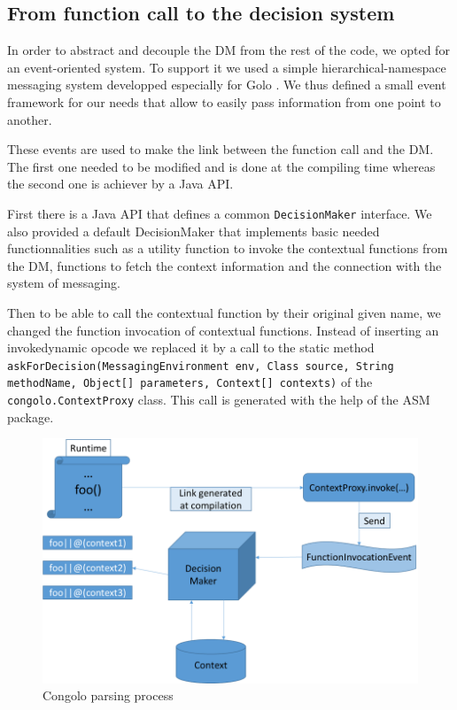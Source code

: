 \documentclass[a4paper]{article}
\begin{document}
\subsection{From function call to the decision system}

In order to abstract and decouple the DM from the rest of the code, we opted for an event-oriented system. To support it we used a simple hierarchical-namespace messaging system developped especially for Golo \cite{flemouel_gololang-messaging_2013}. We thus defined a small event framework for our needs that allow to easily pass information from one point to another.

These events are used to make the link between the function call and the DM. The first one needed to be modified and is done at the compiling time whereas the second one is achiever by a Java API.

First there is a Java API that defines a common \lstinline|DecisionMaker| interface. We also provided a default DecisionMaker that implements basic needed functionnalities such as a utility function to invoke the contextual functions from the DM, functions to fetch the context information and the connection with the system of messaging.

Then to be able to call the contextual function by their original given name, we changed the function invocation of contextual functions. Instead of inserting an invokedynamic opcode we replaced it by a call to the static method \lstinline|askForDecision(MessagingEnvironment env, Class source, String methodName, Object[] parameters, Context[] contexts)| of the \lstinline|congolo.ContextProxy| class. This call is generated with the help of the ASM package.

\begin{center}
\begin{figure}
\centering
\includegraphics[width=0.9\columnwidth]{images/contextual_invocation.png}
\caption{Congolo parsing process}
\label{figure:congoloparsing}
\end{figure}
\end{center}
\end{document}
